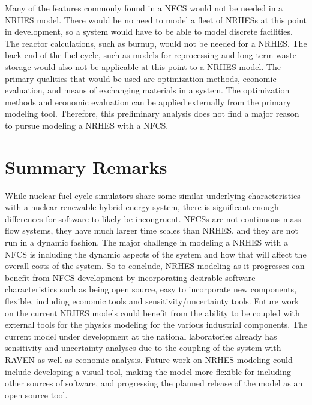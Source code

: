 \documentclass{article}                                                                           %
\begin{document}
\begin{linenumbers}
Many of the features commonly found in a NFCS would not be needed in a NRHES model.  There would be no need to model a fleet of NRHESs at this point in development, so a system would have to be able to model discrete facilities.  The reactor calculations, such as burnup, would not be needed for a NRHES.  The back end of the fuel cycle, such as models for reprocessing and long term waste storage would also not be applicable at this point to a NRHES model.  The primary qualities that would be used are optimization methods, economic evaluation, and means of exchanging materials in a system. The optimization methods and economic evaluation can be applied externally from the primary modeling tool.  Therefore, this preliminary analysis does not find a major reason to pursue modeling a NRHES with a NFCS.

\section{Summary Remarks}
While nuclear fuel cycle simulators share some similar underlying characteristics with a nuclear renewable hybrid energy system, there is significant enough differences for software to likely be incongruent.  NFCSs are not continuous mass flow systems, they have much larger time scales than NRHES, and they are not run in a dynamic fashion. The major challenge in modeling a NRHES with a NFCS is including the dynamic aspects of the system and how that will affect the overall costs of the system. So to conclude, NRHES modeling as it progresses can benefit from NFCS development by incorporating desirable software characteristics such as being open source, easy to incorporate new components, flexible, including economic tools and sensitivity/uncertainty tools. Future work on the current NRHES models could benefit from the ability to be coupled with external tools for the physics modeling for the various industrial components. The current model under development at the national laboratories already has sensitivity and uncertainty analyses due to the coupling of the system with RAVEN as well as economic analysis. Future work on NRHES modeling could include developing a visual tool, making the model more flexible for including other sources of software, and progressing the planned release of the model as an open source tool.


\end{linenumbers}

\end{document}
